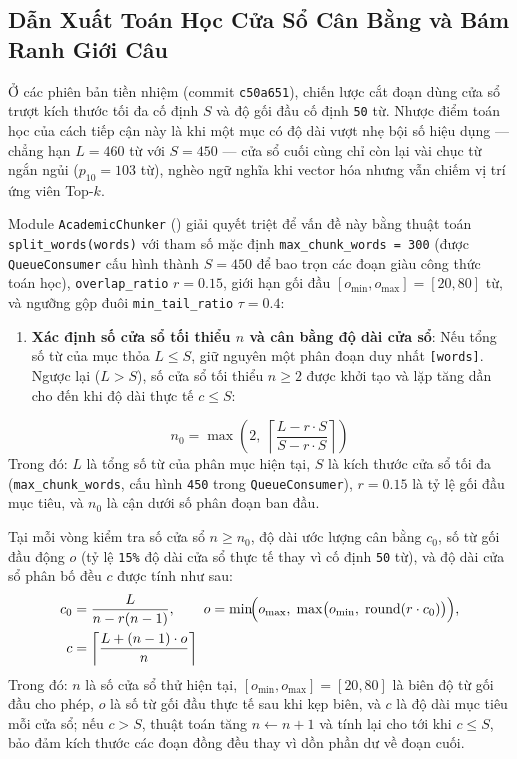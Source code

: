 \subsection{Dẫn Xuất Toán Học Cửa Sổ Cân Bằng và Bám Ranh Giới Câu}
\label{sec:ch2_chunker_math}

Ở các phiên bản tiền nhiệm (commit \texttt{c50a651}), chiến lược cắt đoạn dùng cửa sổ trượt kích thước tối đa cố định $S$ và độ gối đầu cố định \texttt{50} từ. Nhược điểm toán học của cách tiếp cận này là khi một mục có độ dài vượt nhẹ bội số hiệu dụng --- chẳng hạn $L = 460$ từ với $S = 450$ --- cửa sổ cuối cùng chỉ còn lại vài chục từ ngắn ngủi ($p_{10} = 103$ từ), nghèo ngữ nghĩa khi vector hóa nhưng vẫn chiếm vị trí ứng viên Top-$k$.

Module \texttt{AcademicChunker} () giải quyết triệt để vấn đề này bằng thuật toán \texttt{split\_words(words)} với tham số mặc định \texttt{max\_chunk\_words = 300} (được \texttt{QueueConsumer} cấu hình thành $S = 450$ để bao trọn các đoạn giàu công thức toán học), \texttt{overlap\_ratio} $r = 0.15$, giới hạn gối đầu $[o_{\min}, o_{\max}] = [20, 80]$ từ, và ngưỡng gộp đuôi \texttt{min\_tail\_ratio} $\tau = 0.4$:

\begin{enumerate}[label=\textbf{\arabic*.}]
  \item \textbf{Xác định số cửa sổ tối thiểu $n$ và cân bằng độ dài cửa sổ}: Nếu tổng số từ của mục thỏa $L \le S$, giữ nguyên một phân đoạn duy nhất \texttt{[words]}. Ngược lại ($L > S$), số cửa sổ tối thiểu $n \ge 2$ được khởi tạo và lặp tăng dần cho đến khi độ dài thực tế $c \le S$:
\end{enumerate}
\begin{equation}
  n_0 = \max\!\left(2,\; \left\lceil \frac{L - r \cdot S}{S - r \cdot S} \right\rceil\right)
  \label{eq:ch2_chunk_n0}
\end{equation}
\noindent Trong đó: $L$ là tổng số từ của phân mục hiện tại, $S$ là kích thước cửa sổ tối đa (\texttt{max\_chunk\_words}, cấu hình \texttt{450} trong \texttt{QueueConsumer}), $r = 0.15$ là tỷ lệ gối đầu mục tiêu, và $n_0$ là cận dưới số phân đoạn ban đầu.

Tại mỗi vòng kiểm tra số cửa sổ $n \ge n_0$, độ dài ước lượng cân bằng $c_0$, số từ gối đầu động $o$ (tỷ lệ \texttt{15\%} độ dài cửa sổ thực tế thay vì cố định \texttt{50} từ), và độ dài cửa sổ phân bố đều $c$ được tính như sau:
\begin{align}
  c_0 &= \frac{L}{n - r(n - 1)}, \qquad
  o = \min\!\Bigl(o_{\max},\; \max\bigl(o_{\min},\; \operatorname{round}(r \cdot c_0)\bigr)\Bigr), \notag \\
  c &= \left\lceil \frac{L + (n - 1) \cdot o}{n} \right\rceil
  \label{eq:ch2_chunk_balance}
\end{align}
\noindent Trong đó: $n$ là số cửa sổ thử hiện tại, $[o_{\min}, o_{\max}] = [20, 80]$ là biên độ từ gối đầu cho phép, $o$ là số từ gối đầu thực tế sau khi kẹp biên, và $c$ là độ dài mục tiêu mỗi cửa sổ; nếu $c > S$, thuật toán tăng $n \leftarrow n + 1$ và tính lại cho tới khi $c \le S$, bảo đảm kích thước các đoạn đồng đều thay vì dồn phần dư về đoạn cuối.

